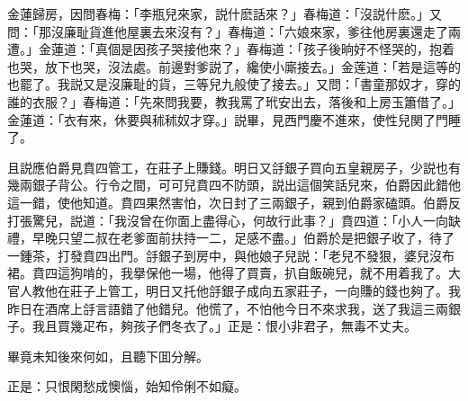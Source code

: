 金蓮歸房，因問春梅：「李瓶兒來家，説什麽話來？」春梅道：「沒説什麽。」又問：「那沒廉耻貨進他屋裏去來沒有？」春梅道：「六娘來家，爹往他房裏還走了兩遭。」金蓮道：「真個是因孩子哭接他來？」春梅道：「孩子後晌好不怪哭的，抱着也哭，放下也哭，沒法處。前邊對爹説了，纔使小廝接去。」金莲道：「若是這等的也罷了。我説又是沒廉耻的貨，三等兒九般使了接去。」又問：「書童那奴才，穿的誰的衣服？」春梅道：「先來問我要，教我罵了玳安出去，落後和上房玉簫借了。」金蓮道：「衣有來，休要與秫秫奴才穿。」説畢，見西門慶不進來，使性兒関了門睡了。

且説應伯爵見賁四管工，在莊子上賺錢。明日又㧱銀子買向五皇親房子，少説也有幾兩銀子背公。行令之間，可可兒賁四不防頭，説出這個笑話兒來，伯爵因此錯他這一錯，使他知道。賁四果然害怕，次日封了三兩銀子，親到伯爵家磕頭。伯爵反打張驚兒，説道：「我沒曾在你面上盡得心，何故行此事？」賁四道：「小人一向缺禮，早晚只望二叔在老爹面前扶持一二，足感不盡。」伯爵於是把銀子收了，待了一鍾茶，打發賁四出門。㧱銀子到房中，與他娘子兒説：「老兒不發狠，婆兒沒布裙。賁四這狗啃的，我擧保他一場，他得了買賣，扒自飯碗兒，就不用着我了。大官人教他在莊子上管工，明日又托他㧱銀子成向五家莊子，一向賺的錢也夠了。我昨日在酒席上㧱言語錯了他錯兒。他慌了，不怕他今日不來求我，送了我這三兩銀子。我且買幾疋布，夠孩子們冬衣了。」正是：恨小非君子，無毒不丈夫。

畢竟未知後來何如，且聽下囬分解。

正是：只恨閑愁成懊惱，始知伶俐不如癡。

